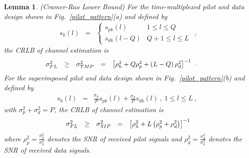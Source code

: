\documentclass[10pt,fleqn, twocolumn]{IEEEtran}
\newtheorem{lemma}{Lemma}
\begin{document}
\begin{figure}
\end{figure}

\begin{lemma}\label{Lemma_CRLB}(Cramer-Rao Lower Bound) For the time-multiplexed pilot and data design shown in Fig.~\ref{pilot_pattern}(a) and defined by
\begin{equation}
\begin{array}{rcl}
s_{k}\left(l\right)&=&
\begin{cases}
s_{pk}(l) & 1 \leq l \leq Q \\
s_{dk}(l-Q) & Q+1\leq l\leq L
\end{cases}
\end{array},\label{TMP_k}
\end{equation}
\noindent the CRLB of channel estimation is
\begin{equation}\hspace{-0.3in}
\begin{array}{rcccl}
\sigma_{\mbox{\tiny FL}}^{2}&\geq&\sigma_{\mbox{\tiny
TMP}}^{2}&=&\left[\rho_{h}^2+Q\rho_{p}^2+\left(L-Q\right)\rho_{d}^2\right]^{-1}
\end{array}.\label{CRLB_TMP}
\end{equation}
\noindent For the superimposed pilot and data design shown in
Fig.~\ref{pilot_pattern}(b) and defined by
\begin{equation}
\begin{array}{rcl}
s_{k}\left(l\right)&=&\frac{\sigma_{p}}{P}s_{pk}\left(l\right)+\frac{\sigma_{d}}{P}s_{dk}\left(l\right)\
,\ 1\leq l\leq L\ ,
\end{array}\label{SIP_k}
\end{equation}
\noindent with $\sigma_{p}^2+\sigma_{d}^2=P$, the CRLB of channel
estimation is
\begin{equation}\
\begin{array}{rcccl}
\sigma_{\mbox{\tiny FL}}^{2}&\geq&\sigma_{\mbox{\tiny
SIP}}^{2}&=&\left[\rho_{h}^2+L\left(\rho_{p}^2+\rho_{d}^2\right)\right]^{-1}
\end{array}\label{CRLB_SIP}
\end{equation}
\noindent where $\rho_{p}^2=\frac{\sigma_{p}^2}{\sigma_{n}^2}$
denotes the SNR of received pilot signals and
$\rho_{d}^2=\frac{\sigma_{d}^2}{\sigma_{n}^2}$ denotes the SNR of
received data signals.
\end{lemma}
\end{document}
